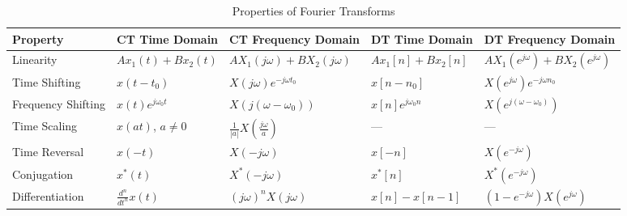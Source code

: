 \documentclass{article}
\begin{document}
\begin{multicols}{2}
    \begin{table*}[ht]
        \centering
        \caption{Properties of Fourier Transforms}
        \label{tab:fourier_transform_properties}
        \small
        \begin{tabular}{@{}lllll@{}}
            \toprule
            \textbf{Property}  & \textbf{CT Time Domain}             & \textbf{CT Frequency Domain}                                  & \textbf{DT Time Domain}            & \textbf{DT Frequency Domain}                                                                            \\
            \midrule
            Linearity          & $A x_1(t) + B x_2(t)$               & $A X_1(j\omega) + B X_2(j\omega)$                             & $A x_1[n] + B x_2[n]$              & $A X_1(e^{j\omega}) + B X_2(e^{j\omega})$                                                               \\ [1mm]
            Time Shifting      & $x(t - t_0)$                        & $X(j\omega)e^{-j\omega t_0}$                                  & $x[n - n_0]$                       & $X(e^{j\omega})e^{-j\omega n_0}$                                                                        \\ [1mm]
            Frequency Shifting & $x(t)e^{j\omega_0 t}$               & $X(j(\omega - \omega_0))$                                     & $x[n]e^{j\omega_0 n}$              & $X(e^{j(\omega - \omega_0)})$                                                                           \\ [1mm]
            Time Scaling       & $x(at)$, $a \neq 0$                 & $\frac{1}{|a|}X\left(\frac{j\omega}{a}\right)$                & ---                                & ---                                                                                                     \\ [1mm]
            Time Reversal      & $x(-t)$                             & $X(-j\omega)$                                                 & $x[-n]$                            & $X(e^{-j\omega})$                                                                                       \\ [1mm]
            Conjugation        & $x^*(t)$                            & $X^*(-j\omega)$                                               & $x^*[n]$                           & $X^*(e^{-j\omega})$                                                                                     \\ [1mm]
            Differentiation    & $\frac{d^n}{dt^n}x(t)$              & $(j\omega)^n X(j\omega)$                                      & $x[n] - x[n-1]$                    & $(1 - e^{-j\omega})X(e^{j\omega})$                                                                      \\ [1mm]

\end{tabular}
\end{table*}
\end{multicols}
\end{document}

